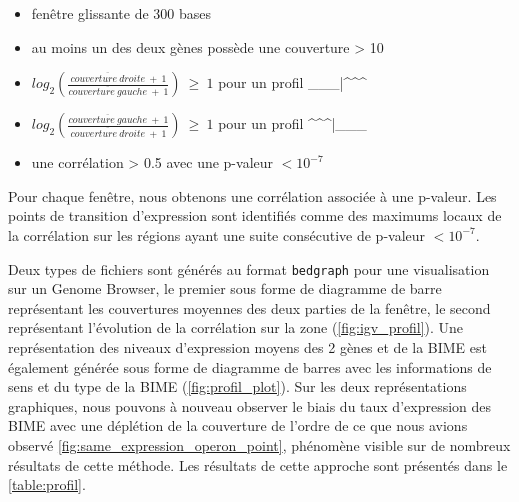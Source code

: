 \documentclass[12pt,a4paper]{report}
\begin{document}
\begin{onehalfspace}
\begin{itemize}[label=$\bullet$]
\item fenêtre glissante de 300 bases
\item au moins un des deux gènes possède une couverture > 10
\item $log_2(\frac{\overline{couverture~droite}~+~1}{\overline{couverture~gauche}~+~1})~\geq~1$ pour un profil \_\_\_|\^{ }\^{ }\^{ }
\item $log_2(\frac{\overline{couverture~gauche}~+~1}{\overline{couverture~droite}~+~1})~\geq~1$ pour un profil \^{ }\^{ }\^{ }|\_\_\_
\item une corrélation > 0.5 avec une p-valeur $< 10^{-7}$
\end{itemize}

Pour chaque fenêtre, nous obtenons une corrélation associée à une p-valeur. Les points de transition d’expression sont identifiés comme des maximums locaux de la corrélation sur les régions ayant une suite consécutive de p-valeur $< 10^{-7}$.

Deux types de fichiers sont générés au format \texttt{bedgraph} pour une visualisation sur un Genome Browser, le premier sous forme de diagramme de barre représentant les couvertures moyennes des deux parties de la fenêtre, le second représentant l'évolution de la corrélation sur la zone (\autoref{fig:igv_profil}). Une représentation des niveaux d'expression moyens des 2 gènes et de la BIME est également générée sous forme de diagramme de barres avec les informations de sens et du type de la BIME (\autoref{fig:profil_plot}). Sur les deux représentations graphiques, nous pouvons à nouveau observer le biais du taux d'expression des BIME avec une déplétion de la couverture de l'ordre de ce que nous avions observé \autoref{fig:same_expression_operon_point}, phénomène visible sur de nombreux résultats de cette méthode. Les résultats de cette approche sont présentés dans le \autoref{table:profil}.


\end{onehalfspace}
\end{document}
